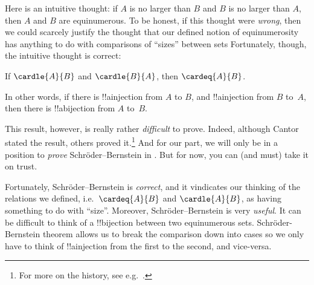 \documentclass[../../../include/open-logic-section]{subfiles}
\begin{document}
	
\begin{explain}
	Here is an intuitive thought: if $A$ is no larger than $B$ and $B$ is no larger than $A$, then $A$ and $B$ are equinumerous. To be honest, if this thought were \emph{wrong}, then we could scarcely justify the thought that our defined notion of equinumerosity has anything to do with comparisons of ``sizes'' between sets\bang{} Fortunately, though, the intuitive thought is correct:
\end{explain}
\begin{thm}
	If $\cardle{A}{B}$ and $\cardle{B}{A}$,
	then $\cardeq{A}{B}$.
\end{thm}\noindent
\begin{explain}In other words, if there is !!a{injection} from $A$ to
$B$, and !!a{injection} from $B$ to~$A$,
then there is !!a{bijection} from $A$ to~$B$. 

This result, however, is really rather \emph{difficult} to prove. Indeed, although Cantor stated the result, others proved it.\footnote{For more on the history, see e.g.\ \citet[165--6]{Potter2004}.} And for our part, we will only be in a position to \emph{prove} Schr\"oder--Bernstein in . But for now, you can (and must) take it on trust. 

Fortunately, Schr\"oder--Bernstein is \emph{correct}, and it vindicates our thinking of the relations we defined, i.e.\ $\cardeq{A}{B}$ and $\cardle{A}{B}$, as having something to do with ``size''. Moreover, Schr\"oder--Bernstein is very \emph{useful}. It can be
difficult to think of a !!{bijection} between two equinumerous sets. Schr\"oder-Bernstein theorem allows us to break the comparison
down into cases so we only have to think of !!a{injection} from the
first to the second, and vice-versa.
\end{explain}
\end{document}

